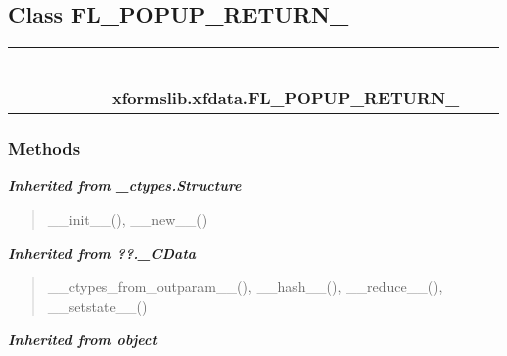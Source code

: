\subsection{Class FL\_POPUP\_RETURN\_}

    \label{xformslib:xfdata:FL_POPUP_RETURN_}
\begin{tabular}{cccccccccc}
\multicolumn{2}{r}{\settowidth{\BCL}{object}\multirow{2}{\BCL}{object}}
&&
&&
&&
  \\\cline{3-3}
  &&\multicolumn{1}{c|}{}
&&
&&
&&
  \\
\multicolumn{4}{r}{\settowidth{\BCL}{??.\_CData}\multirow{2}{\BCL}{??.\_CData}}
&&
&&
  \\\cline{5-5}
  &&&&\multicolumn{1}{c|}{}
&&
&&
  \\
\multicolumn{6}{r}{\settowidth{\BCL}{\_ctypes.Structure}\multirow{2}{\BCL}{\_ctypes.Structure}}
&&
  \\\cline{7-7}
  &&&&&&\multicolumn{1}{c|}{}
&&
  \\
&&&&&&\multicolumn{2}{l}{\textbf{xformslib.xfdata.FL\_POPUP\_RETURN\_}}
\end{tabular}



  \subsubsection{Methods}


\large{\textbf{\textit{Inherited from \_ctypes.Structure}}}

\begin{quote}
\_\_init\_\_(), \_\_new\_\_()
\end{quote}

\large{\textbf{\textit{Inherited from ??.\_CData}}}

\begin{quote}
\_\_ctypes\_from\_outparam\_\_(), \_\_hash\_\_(), \_\_reduce\_\_(), \_\_setstate\_\_()
\end{quote}

\large{\textbf{\textit{Inherited from object}}}

